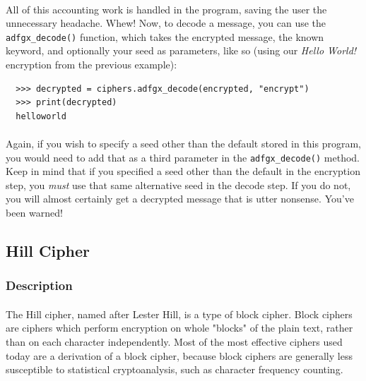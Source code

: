 \documentclass[12pt,a4paper]{article}
\begin{document}
\paragraph{}
All of this accounting work is handled in the program, saving the user the 
unnecessary headache.  Whew!  Now, to decode a message, you can use the 
\verb|adfgx_decode()| function, which takes the encrypted message, the known 
keyword, and optionally your seed as parameters, like so (using our 
\textit{Hello World!} encryption from the previous example):

\begin{verbatim}
  >>> decrypted = ciphers.adfgx_decode(encrypted, "encrypt")
  >>> print(decrypted)
  helloworld
\end{verbatim}

\paragraph{}
Again, if you wish to specify a seed other than the default stored in this 
program, you would need to add that as a third parameter in the 
\verb|adfgx_decode()| method.  Keep in mind that if you specified a seed 
other than the default in the encryption step, you \textit{must} use that 
same alternative seed in the decode step.  If you do not, you will almost 
certainly get a decrypted message that is utter nonsense.  You've been 
warned! 


\subsection{Hill Cipher}
\subsubsection{Description}
\paragraph{}
The Hill cipher, named after Lester Hill, is a type of block cipher.  Block 
ciphers are ciphers which perform encryption on whole "blocks" of the plain 
text, rather than on each character independently.  Most of the most effective 
ciphers used today are a derivation of a block cipher, because block ciphers 
are generally less susceptible to statistical cryptoanalysis, such as character 
frequency counting.
\end{document}
